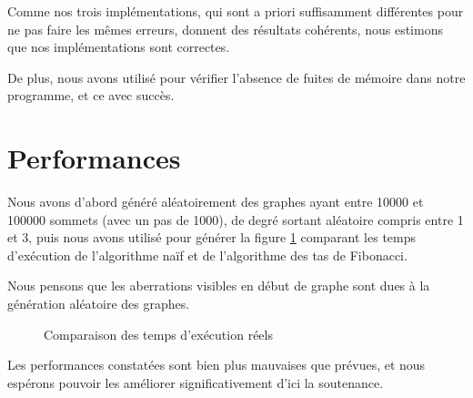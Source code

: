 \documentclass[12p0t,a4paper]{article}
\begin{document}
Comme nos trois implémentations, qui sont a priori suffisamment différentes pour ne pas faire les mêmes erreurs, donnent des résultats cohérents, nous estimons que nos implémentations sont correctes.

De plus, nous avons utilisé  pour vérifier l'absence de fuites de mémoire dans notre programme, et ce avec succès.

\section{Performances}

Nous avons d'abord généré aléatoirement des graphes ayant entre 10000 et 100000 sommets (avec un pas de 1000), de degré sortant aléatoire compris entre 1 et 3, puis nous avons utilisé  pour générer la figure \ref{fig:graph} comparant les temps d'exécution de l'algorithme naïf et de l'algorithme des tas de Fibonacci.

Nous pensons que les aberrations visibles en début de graphe sont dues à la génération aléatoire des graphes.

\begin{figure}[h!]
  \begin{center}
    \caption{Comparaison des temps d'exécution réels}
    \label{fig:graph}
  \end{center}
\end{figure}

Les performances constatées sont bien plus mauvaises que prévues, et nous espérons pouvoir les améliorer significativement d'ici la soutenance.
\end{document}
